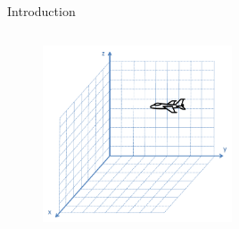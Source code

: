\begin{frame}{Introduction}
\begin{columns}
\begin{itemize}
        \begin{figure}
            \centering
            \includegraphics[width=0.5\textwidth]{Figures/Chapter2/3Dfighter.png}
            \label{fig:3Dfighter}
            \vspace{-5pt}
        \end{figure}
    \end{itemize}
\end{columns}
\end{frame}
